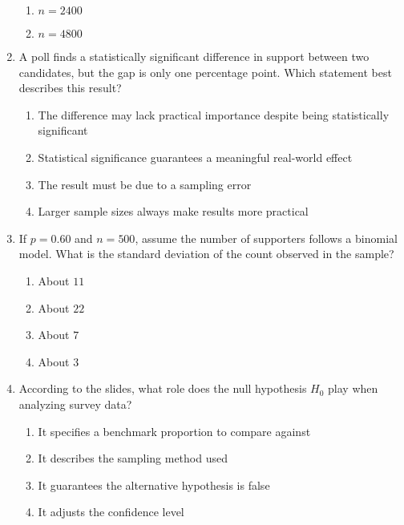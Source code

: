 \documentclass{article}
\begin{document}
\begin{enumerate}
\begin{enumerate}[label=(\Alph*)]
  \item $n=2400$
  \item $n=4800$
  \end{enumerate}
\item A poll finds a statistically significant difference in support between two candidates, but the gap is only one percentage point. Which statement best describes this result?
  \begin{enumerate}[label=(\Alph*)]
  \item The difference may lack practical importance despite being statistically significant
  \item Statistical significance guarantees a meaningful real-world effect
  \item The result must be due to a sampling error
  \item Larger sample sizes always make results more practical
  \end{enumerate}
\item If $p=0.60$ and $n=500$, assume the number of supporters follows a binomial model. What is the standard deviation of the count observed in the sample?
  \begin{enumerate}[label=(\Alph*)]
  \item About $11$
  \item About $22$
  \item About $7$
  \item About $3$
  \end{enumerate}
\item According to the slides, what role does the null hypothesis $H_0$ play when analyzing survey data?
  \begin{enumerate}[label=(\Alph*)]
  \item It specifies a benchmark proportion to compare against
  \item It describes the sampling method used
  \item It guarantees the alternative hypothesis is false
  \item It adjusts the confidence level
  \end{enumerate}
\end{enumerate}
\end{document}
